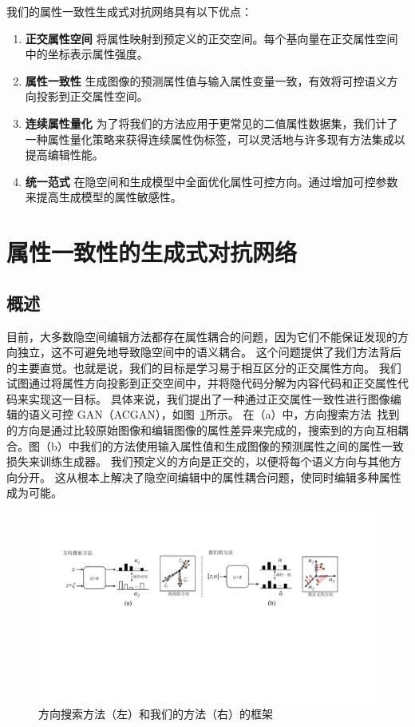 我们的属性一致性生成式对抗网络具有以下优点：
\begin{enumerate}
    \item \textbf{正交属性空间} 将属性映射到预定义的正交空间。每个基向量在正交属性空间中的坐标表示属性强度。
    \item \textbf{属性一致性} 生成图像的预测属性值与输入属性变量一致，有效将可控语义方向投影到正交属性空间。
    \item \textbf{连续属性量化} 为了将我们的方法应用于更常见的二值属性数据集，我们计了一种属性量化策略来获得连续属性伪标签，可以灵活地与许多现有方法集成以提高编辑性能。
    \item \textbf{统一范式} 在隐空间和生成模型中全面优化属性可控方向。通过增加可控参数来提高生成模型的属性敏感性。
\end{enumerate}

\section{属性一致性的生成式对抗网络}

\subsection{概述}
目前，大多数隐空间编辑方法都存在属性耦合的问题，因为它们不能保证发现的方向独立，这不可避免地导致隐空间中的语义耦合。
这个问题提供了我们方法背后的主要直觉。也就是说，我们的目标是学习易于相互区分的正交属性方向。
我们试图通过将属性方向投影到正交空间中，并将隐代码分解为内容代码和正交属性代码来实现这一目标。
具体来说，我们提出了一种通过正交属性一致性进行图像编辑的语义可控 GAN（ACGAN），如图~\ref{fig:framework}所示。 在（a）中，方向搜索方法~\cite{icml2020, iclr2021}找到的方向是通过比较原始图像和编辑图像的属性差异来完成的，搜索到的方向互相耦合。图（b）中我们的方法使用输入属性值和生成图像的预测属性之间的属性一致损失来训练生成器。 我们预定义的方向是正交的，以便将每个语义方向与其他方向分开。
这从根本上解决了隐空间编辑中的属性耦合问题，使同时编辑多种属性成为可能。

\begin{figure}
    \centering
    \includegraphics[width=1\linewidth]{figures/ACGAN/framework.pdf}
    \caption{方向搜索方法（左）和我们的方法（右）的框架}
    \label{fig:framework}
  \end{figure}

